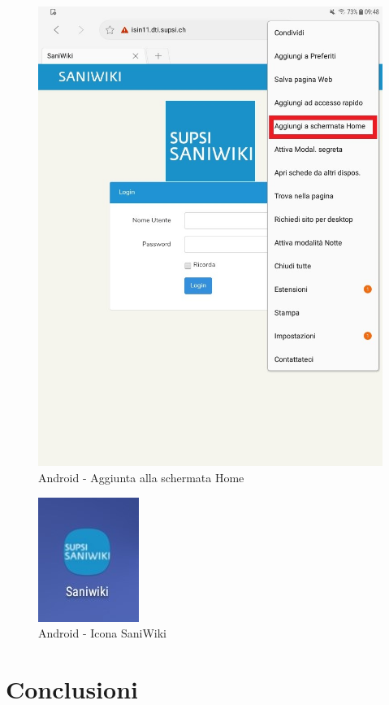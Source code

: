 \documentclass[twoside]{supsistudent}
\begin{document}
\begin{figure}[!h]
\centering
\includegraphics[scale=0.3]{saniwiki_android2.png}
\caption{Android - Aggiunta alla schermata Home}
\end{figure}
\begin{figure}[!h]
\centering
\includegraphics[scale=0.4]{saniwiki_android3.png}
\caption{Android - Icona SaniWiki}
\end{figure}




\chapter{Conclusioni}
\end{document}

